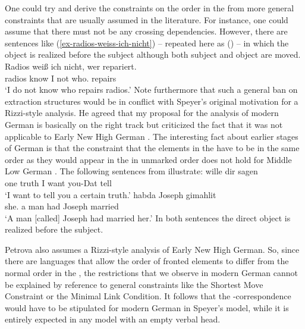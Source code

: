 One could try and derive the constraints on the order in the \vf from more general constraints that
are usually assumed in the literature. For instance, one could assume that there must not be any
crossing dependencies. However, there are sentences like (\ref{ex-radios-weiss-ich-nicht}) -- repeated here as () -- in which
the object is realized before the subject although both subject and object are moved.
\ea
\label{ex-radios-weiss-ich-nicht-zwei}
\gll Radios weiß ich nicht, wer repariert.\\
     radios know I not who.\nom{} repairs\\
\glt `I do not know who repairs radios.'
\z
Note furthermore that such a general ban on extraction structures would be in conflict with Speyer's
original motivation for a Rizzi-style analysis. He agreed that my proposal for the analysis of
modern German is basically on the right track  but criticized the fact that it was not applicable to Early New High
German \citep[]{Speyer2008a}. The interesting fact about earlier stages of German is that the constraint that the elements
in the \vf have to be in the same order as they would appear in the \mf in unmarked order does not
hold for Middle Low German \citep[Section~5.2]{Petrova2012a}. The following sentences from  illustrate:
\eal
\ex
{} wille dir sagen\\
     \spacebr{}one truth \spacebr{}I want you-Dat tell\\
\glt `I want to tell you a certain truth.’
\ex
\gll [Sea] [en thegan] habda Joseph gimahlit\\
     \spacebr{}she.\acc{} \spacebr{}a man had Joseph married\\
\glt `A man [called] Joseph had married her.'
\zl
In both sentences the direct object is realized before the subject.

Petrova also assumes a Rizzi-style analysis of
Early New High German. So, since there are languages that allow the order of fronted elements to
differ from the normal order in the \mf, the restrictions that we observe in modern German cannot be
explained by reference to general constraints like the Shortest Move Constraint or the Minimal Link
Condition. It follows that the \vf-\mf correspondence would have to be stipulated for modern German
in Speyer's model, while it is entirely expected in any model with an empty verbal head.


